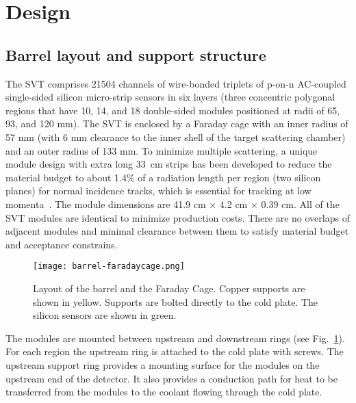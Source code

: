 \section{Design}

\subsection{Barrel layout and support structure}

The SVT comprises 21504 channels of wire-bonded triplets of p-on-n AC-coupled single-sided silicon micro-strip sensors in six layers (three concentric polygonal regions that have 10, 14, and 18 double-sided modules positioned at radii of 65, 93, and 120 mm). The SVT is enclosed by a Faraday cage with an inner radius of 57 mm (with 6 mm clearance to the inner shell of the target scattering chamber) and an outer radius of 133 mm. To minimize multiple scattering, a unique module design with extra long 33~cm strips has been developed to reduce the material budget to about 1.4$\%$ of a radiation length per region (two silicon planes) for normal incidence tracks, which is essential for tracking at low momenta~\cite{Vertex2016}. The module dimensions are 41.9 cm $\times$ 4.2 cm $\times$ 0.39 cm. All of the SVT modules are identical to minimize production costs. There are no overlaps of adjacent modules and minimal clearance between them to satisfy material budget and acceptance constrains.

\begin{figure}[hbt] 
\centering 
\texttt{[image: barrel-faradaycage.png]}
\caption{Layout of the barrel and the Faraday Cage. Copper supports are shown in yellow.  Supports are bolted directly to the cold plate. The silicon sensors are shown in green.}
\label{fig:barrel-faradaycage}
\end{figure}



The modules  are mounted between upstream and downstream rings (see Fig.~\ref{fig:barrel-faradaycage}). For each region the upstream ring is attached to the cold plate with screws. The upstream support ring provides a mounting surface for the modules on the upstream end of the detector. It also provides a conduction path for heat to be transferred from the modules to the coolant flowing through the cold plate. 

